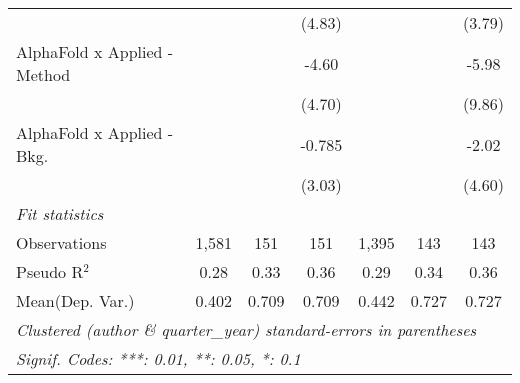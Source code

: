 \begin{tabular}{lcccccc}
                                &               &           & (4.83)      &               &           & (3.79)\\   
   AlphaFold x Applied - Method &               &           & -4.60       &               &           & -5.98\\   
                                &               &           & (4.70)      &               &           & (9.86)\\   
   AlphaFold x Applied - Bkg.   &               &           & -0.785      &               &           & -2.02\\   
                                &               &           & (3.03)      &               &           & (4.60)\\   
   \midrule
   \emph{Fit statistics}\\
   Observations                 & 1,581         & 151       & 151         & 1,395         & 143       & 143\\  
   Pseudo R$^2$                 & 0.28          & 0.33      & 0.36        & 0.29          & 0.34      & 0.36\\  
Mean(Dep. Var.) & 0.402 & 0.709 & 0.709 & 0.442 & 0.727 & 0.727 \\
   \midrule \midrule
   \multicolumn{7}{l}{\emph{Clustered (author \& quarter\_year) standard-errors in parentheses}}\\
   \multicolumn{7}{l}{\emph{Signif. Codes: ***: 0.01, **: 0.05, *: 0.1}}\\
\end{tabular}
\par\endgroup

